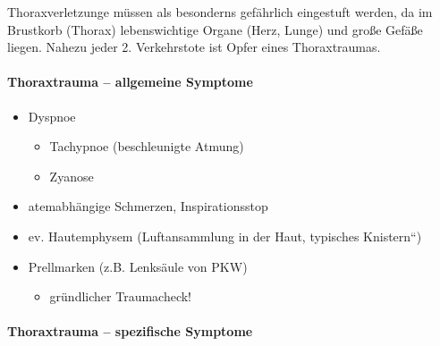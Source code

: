 Thoraxverletzunge müssen als besonderns gefährlich eingestuft
werden, da im Brustkorb (Thorax) lebenswichtige Organe (Herz,
Lunge) und große Gefäße liegen.  Nahezu jeder 2. Verkehrstote
ist Opfer eines Thoraxtraumas. \cite{Gorgass7}


\paragraph{Thoraxtrauma -- allgemeine  Symptome}

\begin{itemize}
    \item Dyspnoe
    \begin{itemize}
        \item Tachypnoe (beschleunigte Atmung)
        \item Zyanose
    \end{itemize}
    \item atemabh\"angige  Schmerzen,  Inspirationsstop
    \item ev. Hautemphysem (Luftansammlung in der Haut, typisches
    {\quotedblbase}Knistern{\textquotedblleft})
    \item Prellmarken (z.B. Lenks\"aule von PKW)
    \begin{itemize}
        \item gr\"undlicher Traumacheck!
    \end{itemize}
\end{itemize}

\paragraph{Thoraxtrauma -- spezifische  Symptome}

